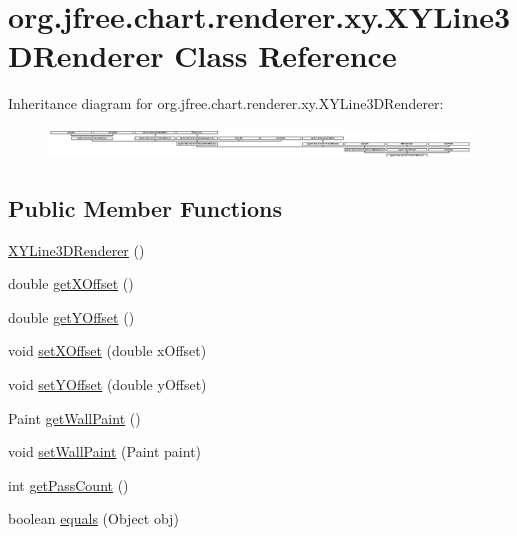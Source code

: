 \hypertarget{classorg_1_1jfree_1_1chart_1_1renderer_1_1xy_1_1_x_y_line3_d_renderer}{}\section{org.\+jfree.\+chart.\+renderer.\+xy.\+X\+Y\+Line3\+D\+Renderer Class Reference}
\label{classorg_1_1jfree_1_1chart_1_1renderer_1_1xy_1_1_x_y_line3_d_renderer}
Inheritance diagram for org.\+jfree.\+chart.\+renderer.\+xy.\+X\+Y\+Line3\+D\+Renderer\+:\begin{figure}[H]
\begin{center}
\leavevmode
\includegraphics[height=0.845922cm]{classorg_1_1jfree_1_1chart_1_1renderer_1_1xy_1_1_x_y_line3_d_renderer}
\end{center}
\end{figure}
\subsection*{Public Member Functions}
\begin{DoxyCompactItemize}
\item 
\mbox{\hyperlink{classorg_1_1jfree_1_1chart_1_1renderer_1_1xy_1_1_x_y_line3_d_renderer_a4b911d0f368ef050731f7cbb0b4c9e30}{X\+Y\+Line3\+D\+Renderer}} ()
\item 
double \mbox{\hyperlink{classorg_1_1jfree_1_1chart_1_1renderer_1_1xy_1_1_x_y_line3_d_renderer_a54f46c28c7bdc128e08b4281efc8d3e5}{get\+X\+Offset}} ()
\item 
double \mbox{\hyperlink{classorg_1_1jfree_1_1chart_1_1renderer_1_1xy_1_1_x_y_line3_d_renderer_a3515dadc0751fe1e43073c5f67cad3e1}{get\+Y\+Offset}} ()
\item 
void \mbox{\hyperlink{classorg_1_1jfree_1_1chart_1_1renderer_1_1xy_1_1_x_y_line3_d_renderer_ac307033cb9c5c74a827b6c8b09735516}{set\+X\+Offset}} (double x\+Offset)
\item 
void \mbox{\hyperlink{classorg_1_1jfree_1_1chart_1_1renderer_1_1xy_1_1_x_y_line3_d_renderer_a4ebd6f3becf2252afa54fc72d13ccedc}{set\+Y\+Offset}} (double y\+Offset)
\item 
Paint \mbox{\hyperlink{classorg_1_1jfree_1_1chart_1_1renderer_1_1xy_1_1_x_y_line3_d_renderer_a652c8812a2775b97b7d8e3b677031a65}{get\+Wall\+Paint}} ()
\item 
void \mbox{\hyperlink{classorg_1_1jfree_1_1chart_1_1renderer_1_1xy_1_1_x_y_line3_d_renderer_acc630b8996d5b715ffc86f4e9375db68}{set\+Wall\+Paint}} (Paint paint)
\item 
int \mbox{\hyperlink{classorg_1_1jfree_1_1chart_1_1renderer_1_1xy_1_1_x_y_line3_d_renderer_ae6fc5225d949fe1220d4ed0c4ae3d900}{get\+Pass\+Count}} ()
\item 
boolean \mbox{\hyperlink{classorg_1_1jfree_1_1chart_1_1renderer_1_1xy_1_1_x_y_line3_d_renderer_a69e0e01680274fbf1921b672adfc88e7}{equals}} (Object obj)
\end{DoxyCompactItemize}

